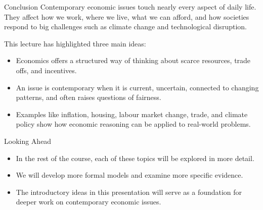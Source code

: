 \documentclass[aspectratio=169]{beamer}
\begin{document}
\begin{frame}{Conclusion}
  \transfade
  Contemporary economic issues touch nearly every aspect of daily life. They affect how we
  work, where we live, what we can afford, and how societies respond to big challenges such
  as climate change and technological disruption.

  \vspace{0.3cm}
  This lecture has highlighted three main ideas:
  \begin{itemize}[<+->]
    \item Economics offers a structured way of thinking about scarce resources, trade offs, and
    incentives.
    \item An issue is contemporary when it is current, uncertain, connected to changing patterns,
    and often raises questions of fairness.
    \item Examples like inflation, housing, labour market change, trade, and climate policy show
    how economic reasoning can be applied to real-world problems.
  \end{itemize}
\end{frame}

\begin{frame}{Looking Ahead}
  \transfade
  \begin{itemize}[<+->]
    \item In the rest of the course, each of these topics will be explored in more detail.
    \item We will develop more formal models and examine more specific evidence.
    \item The introductory ideas in this presentation will serve as a foundation for deeper work
    on contemporary economic issues.
  \end{itemize}
\end{frame}

\end{document}
